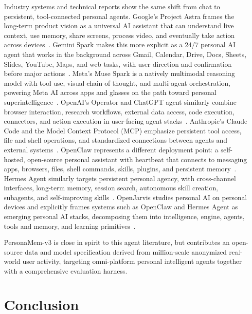\documentclass[]{fairmeta}
\begin{document}
Industry systems and technical reports show the same shift from chat to persistent, tool-connected personal agents. Google's Project Astra frames the long-term product vision as a universal AI assistant that can understand live context, use memory, share screens, process video, and eventually take action across devices~\citep{google2025projectastra}. Gemini Spark makes this more explicit as a 24/7 personal AI agent that works in the background across Gmail, Calendar, Drive, Docs, Sheets, Slides, YouTube, Maps, and web tasks, with user direction and confirmation before major actions~\citep{google2026geminispark}. Meta's Muse Spark is a natively multimodal reasoning model with tool use, visual chain of thought, and multi-agent orchestration, powering Meta AI across apps and glasses on the path toward personal superintelligence~\citep{meta2026musespark}. OpenAI's Operator and ChatGPT agent similarly combine browser interaction, research workflows, external data access, code execution, connectors, and action execution in user-facing agent stacks~\citep{openai2025agentsplatform, openai2025chatgptagent, openai2025operator}. Anthropic's Claude Code and the Model Context Protocol (MCP) emphasize persistent tool access, file and shell operations, and standardized connections between agents and external systems~\citep{anthropic2024mcp, anthropic2026claudecode}. OpenClaw represents a different deployment point: a self-hosted, open-source personal assistant with heartbeat that connects to messaging apps, browsers, files, shell commands, skills, plugins, and persistent memory~\citep{openclaw2026}. Hermes Agent similarly targets persistent personal agency, with cross-channel interfaces, long-term memory, session search, autonomous skill creation, subagents, and self-improving skills~\citep{nousresearch2026hermesagent}. OpenJarvis studies personal AI on personal devices and explicitly frames systems such as OpenClaw and Hermes Agent as emerging personal AI stacks, decomposing them into intelligence, engine, agents, tools and memory, and learning primitives~\citep{saadfalcon2026openjarvis}.

PersonaMem-v3 is close in spirit to this agent literature, but contributes an open-source data and model specification derived from million-scale anonymized real-world user activity, targeting omni-platform personal intelligent agents together with a comprehensive evaluation harness.


\section{Conclusion}
\end{document}
